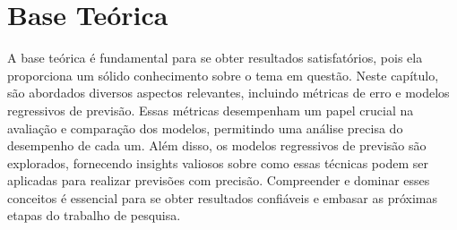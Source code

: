 \section{Base Te\'orica}\label{sec:base}

A base teórica é fundamental para se obter resultados satisfatórios, pois ela proporciona um sólido conhecimento sobre o tema em questão. Neste capítulo, são abordados diversos aspectos relevantes, incluindo métricas de erro e modelos regressivos de previsão. Essas métricas desempenham um papel crucial na avaliação e comparação dos modelos, permitindo uma análise precisa do desempenho de cada um. Além disso, os modelos regressivos de previsão são explorados, fornecendo insights valiosos sobre como essas técnicas podem ser aplicadas para realizar previsões com precisão. Compreender e dominar esses conceitos é essencial para se obter resultados confiáveis e embasar as próximas etapas do trabalho de pesquisa.









